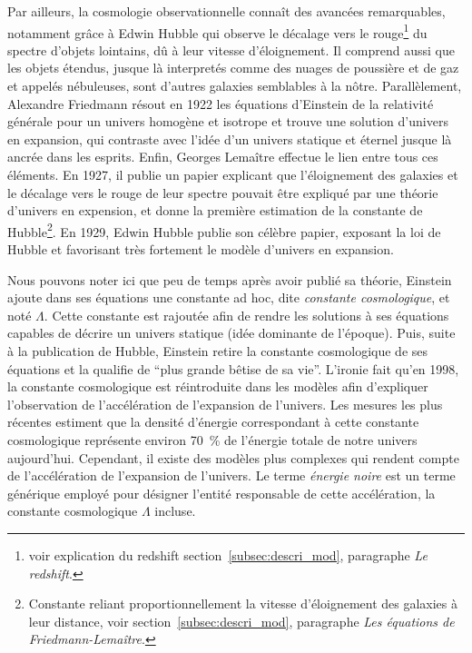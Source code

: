 \documentclass[11pt, twoside, a4paper, openright]{report}
\begin{document}
Par ailleurs, la cosmologie observationnelle connaît des avancées remarquables, notamment grâce à Edwin Hubble qui observe le décalage vers le rouge\footnote{voir explication du redshift section~\ref{subsec:descri_mod}, paragraphe \emph{Le redshift}.} du spectre d'objets lointains, dû à leur vitesse d'éloignement. Il comprend aussi que les objets étendus, jusque là interpretés comme des nuages de poussière et de gaz et appelés nébuleuses, sont d'autres galaxies semblables à la nôtre. Parallèlement, Alexandre Friedmann résout en 1922 les équations d'Einstein de la relativité générale pour un univers homogène et isotrope et trouve une solution d'univers en expansion, qui contraste avec l'idée d'un univers statique et éternel jusque là ancrée dans les esprits. Enfin, Georges Lemaître effectue le lien entre tous ces éléments. En 1927, il publie un papier explicant que l'éloignement des galaxies et le décalage vers le rouge de leur spectre pouvait être expliqué par une théorie d'univers en expension, et donne la première estimation de la constante de Hubble\footnote{Constante reliant proportionnellement la vitesse d'éloignement des galaxies à leur distance, voir section~\ref{subsec:descri_mod}, paragraphe \emph{Les équations de Friedmann-Lemaître}.}. En 1929, Edwin Hubble publie son célèbre papier, exposant la loi de Hubble et favorisant très fortement le modèle d'univers en expansion.

Nous pouvons noter ici que peu de temps après avoir publié sa théorie, Einstein ajoute dans ses équations une constante ad hoc, dite \emph{constante cosmologique}, et noté $\Lambda$. Cette constante est rajoutée afin de rendre les solutions à ses équations capables de décrire un univers statique (idée dominante de l'époque). Puis, suite à la publication de Hubble, Einstein retire la constante cosmologique de ses équations et la qualifie de ``plus grande bêtise de sa vie''. L'ironie fait qu'en 1998, la constante cosmologique est réintroduite dans les modèles afin d'expliquer l'observation de l'accélération de l'expansion de l'univers. Les mesures les plus récentes estiment que la densité d'énergie correspondant à cette constante cosmologique représente environ \SI{70}{\percent} de l'énergie totale de notre univers aujourd'hui. Cependant, il existe des modèles plus complexes qui rendent compte de l'accélération de l'expansion de l'univers. Le terme \emph{énergie noire} est un terme générique employé pour désigner l'entité responsable de cette accélération, la constante cosmologique $\Lambda$ incluse.
\end{document}
